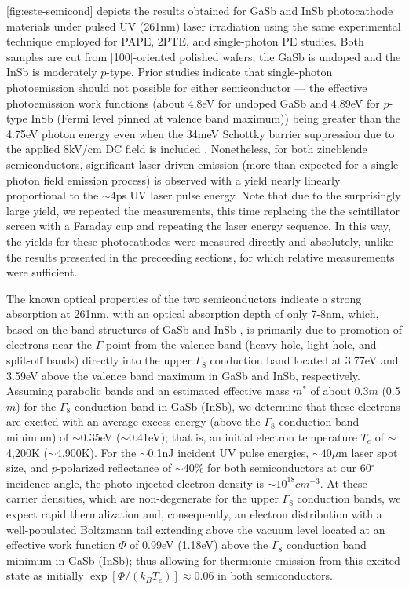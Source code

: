 \ref{fig:este-semicond} depicts the results obtained for GaSb and InSb photocathode materials under pulsed UV (261nm) laser irradiation using the same experimental technique employed for PAPE, 2PTE, and single-photon PE studies.
Both samples are cut from [100]-oriented polished wafers; the GaSb is undoped and the InSb is moderately $p$-type.
Prior studies \cite{gobeli_photoelectric_1965} indicate that single-photon photoemission should not possible for either semiconductor --- the effective photoemission work functions (about 4.8eV for undoped GaSb and 4.89eV for $p$-type InSb (Fermi level pinned at valence band maximum)) being greater than the 4.75eV photon energy even when the 34meV Schottky barrier suppression due to the applied 8kV/cm DC field is included \cite{dowell_quantum_2009}.
Nonetheless, for both zincblende semiconductors, significant laser-driven emission (more than expected for a single-photon field emission process) is observed with a yield nearly linearly proportional to the $\sim$4ps UV laser pulse energy.
Note that due to the surprisingly large yield, we repeated the measurements, this time replacing the the scintillator screen with a Faraday cup and repeating the laser energy sequence.
In this way, the yields for these photocathodes were measured directly and absolutely, unlike the results presented in the preceeding sections, for which relative measurements were sufficient.

The known optical properties of the two semiconductors \cite{aspnes_dielectric_1983} indicate a strong absorption at 261nm, with an optical absorption depth of only 7-8nm, which, based on the band structures of GaSb \cite{chelikowsky_nonlocal_1976} and InSb \cite{chelikowsky_erratum_1984}, is primarily due to promotion of electrons near the $\Gamma$ point from the valence band (heavy-hole, light-hole, and split-off bands) directly into the upper $\Gamma_8$ conduction band located at 3.77eV and 3.59eV above the valence band maximum in GaSb and InSb, respectively.
Assuming parabolic bands and an estimated effective mass $m^*$ of about 0.3$m$ (0.5$m$) for the $\Gamma_8$ conduction band in GaSb (InSb), we determine that these electrons are excited with an average excess energy (above the $\Gamma_8$ conduction band minimum) of $\sim$0.35eV ($\sim$0.41eV); that is, an initial electron temperature $T_e$ of $\sim$4,200K ($\sim$4,900K).
For the $\sim$0.1nJ incident UV pulse energies, $\sim40\mu$m laser spot size, and $p$-polarized reflectance of $\sim$40\% for both semiconductors at our 60$^{\circ}$ incidence angle, the photo-injected electron density is $\sim10^{18}cm^{-3}$.
At these carrier densities, which are non-degenerate for the upper $\Gamma_8$ conduction bands, we expect rapid thermalization \cite{portella_k-space_1992} and, consequently, an electron distribution with a well-populated Boltzmann tail extending above the vacuum level located at an effective work function $\Phi$ of 0.99eV (1.18eV) above the $\Gamma_8$ conduction band minimum in GaSb (InSb); thus allowing for thermionic emission from this excited state as initially $\exp[\Phi/(k_B T_e)] \approx 0.06$ in both semiconductors.  


